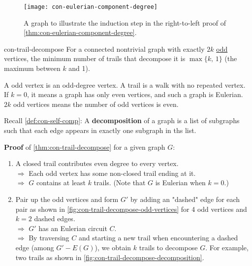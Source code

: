 \documentclass[../src/handouts/main.tex]{subfiles}
\begin{document}
\begin{figure}[htbp]
  \centering
  \texttt{[image: con-eulerian-component-degree]}
  \caption{A graph to illustrate the induction step in the right-to-left proof of \cref{thm:con-eulerian-component-degree}.}
  \label{fig:con-eulerian-component-degree}
\end{figure}

\begin{theorem}{}{con-trail-decompose}
  For a connected nontrivial graph with exactly $2 k$ \underline{odd} vertices, the minimum number of trails that decompose it is $\max \{k,\, 1\}$ (the maximum between $k$ and 1).
\end{theorem}

A odd vertex is an odd-degree vertex. A trail is a walk with no repeated vertex. If $k = 0$, it means a graph has only even vertices, and such a graph is Eulerian. $2 k$ odd vertices means the number of odd vertices is even.

Recall \cref{def:con-self-comp}: A \textbf{decomposition} of a graph is a list of subgraphs such that each edge appears in exactly one subgraph in ths list.

\textbf{Proof} of \cref{thm:con-trail-decompose} for a given graph $G$:
\begin{enumerate}
  \item A closed trail contributes even degree to every vertex.\\
        $\Rightarrow$ Each odd vertex has some non-closed trail ending at it.\\
        $\Rightarrow$ $G$ contains at least $k$ trails. (Note that $G$ is Eulerian when $k = 0$.)
  \item Pair up the odd vertices and form $G'$ by adding an "dashed" edge for each pair as shown in \cref{fig:con-trail-decompose-odd-vertices} for 4 odd vertices and $k = 2$ dashed edges.\\
        $\Rightarrow$ $G'$ has an Eulerian circuit $C$.\\
        $\Rightarrow$ By traversing $C$ and starting a new trail when encountering a dashed edge (among $G' - E(G)$), we obtain $k$ trails to decompose $G$. For example, two trails as shown in \cref{fig:con-trail-decompose-decomposition}.
\end{enumerate}
\end{document}
